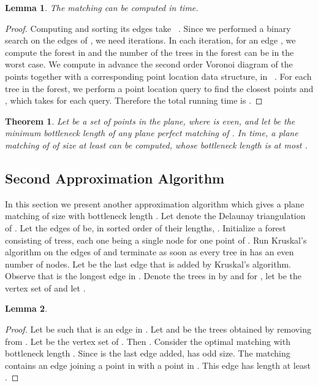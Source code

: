 \documentclass[11pt,a4paper]{article}
\newtheorem{lemma}{Lemma}
\newtheorem{theorem}{Theorem}
\begin{document}
\begin{lemma}
\label{running-time}
 The matching  can be computed in  time.
\end{lemma}
\begin{proof}
Computing  and sorting its edges take ~\cite{deBerg08}. Since we performed a binary search on the edges of , we need  iterations. In each iteration, for an edge , we compute the forest  in  and the number of the trees in the forest can be  in the worst case. We compute in advance the second order Voronoi diagram of the points together with a corresponding point location data structure, in ~\cite{deBerg08}. For each tree in the forest, we perform a point location query to find the closest points  and , which takes  for each query. Therefore the total running time is .
\end{proof}

\begin{theorem}
\label{two-over-five-theorem-2}
Let  be a set of  points in the plane, where  is even, and let  be the minimum bottleneck length of any plane perfect matching of . In  time, a plane matching of  of size at least  can be computed, whose bottleneck length is at most .
\end{theorem}

\subsection{Second Approximation Algorithm}
\label{bottleneck-five-over-four}

In this section we present another approximation algorithm which gives a plane matching  of size  with bottleneck length . Let  denote the Delaunay triangulation of . Let the edges of  be, in sorted order of their lengths, . Initialize a forest  consisting of  tress, each one being a single node for one point of . Run Kruskal's algorithm on the edges of  and terminate as soon as every tree in  has an even number of nodes. Let  be the last edge that is added by Kruskal's algorithm. Observe that  is the longest edge in . Denote the trees in  by  and for , let  be the vertex set of  and let . 

\begin{lemma}
\label{longest-edge}
 
\end{lemma}
\begin{proof}
Let  be such that  is an edge in . Let  and  be the trees obtained by removing  from . Let  be the vertex set of . Then . Consider the optimal matching  with bottleneck length . Since  is the last edge added,  has odd size. The matching  contains an edge joining a point in  with a point in . This edge has length at least .
\end{proof}
\end{document}
